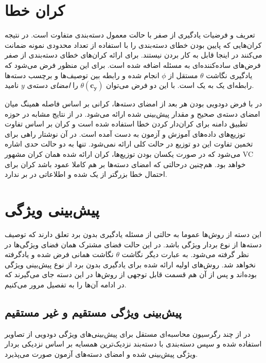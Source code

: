    


\section{کران خطا}\label{bound}
تعریف و فرضیات یادگیری از صفر با حالت معمول دسته‌بندی متفاوت است. در نتیجه کران‌هایی که پایین بودن خطای دسته‌بندی را با استفاده از تعداد محدودی نمونه ضمانت می‌کنند در اینجا قابل به کار بردن نیستند. برای ارائه کران‌های خطای دسته‌بندی از صفر فرض‌های ساده‌کننده‌ای به مسئله اضافه شده است. برای این منظور فرض می‌شود که یادگیری نگاشت 
$\theta$
 مستقل از $\phi$ انجام شده و رابطه بین توصیف‌ها و برچسب دسته‌ها رابطه‌ای یک به یک است. با این دو فرض می‌توان
  $\theta(\mathbf{c_y} ) $
   را \emph{ امضای}  دسته‌ی $y$ نامید. 

در \cite{hinton09} با فرض دودویی بودن هر بعد از امضای دسته‌ها، کرانی  بر اساس فاصله همینگ 
میان امضای دسته‌ی صحیح و مقدار پیش‌بینی شده ارائه می‌شود. در \cite{emb15} از نتایج مشابه در حوزه تطبیق دامنه برای کران‌دار کردن خطا استفاده شده است و کران بر اساس تفاوت توزیع‌های داده‌های آموزش و آزمون به دست آمده است. در آن نوشتار راهی برای تخمین تفاوت این دو توزیع در حالت کلی ارائه نمی‌شود. تنها به دو حالت حدی اشاره می‌شود که در صورت یکسان بودن توزیع‌ها، کران ارائه شده همان کران مشهور VC \cite{vapnik} خواهد بود. هم‌چنین درحالتی که امضای دسته‌ها بر هم کاملا عمود باشد کران برای احتمال خطا بزرگتر از یک شده و اطلاعاتی در بر ندارد. 
\section{پیش‌بینی ویژگی  }
این دسته از روش‌ها عموما به حالتی از مسئله یادگیری بدون برد تعلق دارند که توصیف دسته‌ها از نوع بردار ویژگی باشد. در این حالت فضای مشترک همان فضای ویژگی‌ها در نظر گرفته می‌شود. به عبارت دیگر نگاشت $\theta$ نگاشت همانی فرض شده و یادگرفته نخواهد شد. روش‌های اولیه ارائه شده برای یادگیری بدون برد از نوع پیش‌بینی ویژگی
بوده‌اند و پس از آن‌ هم قسمت قابل توجهی از روش‌ها در این دسته جای می‌گیرند که در ادامه آن‌ها را به تفصیل مرور می‌کنیم.

\subsection{پیش‌بینی ویژگی مستقیم و غیر مستقیم}

در \cite{hinton09} از چند رگرسیون محاسبه‌ای  مستقل برای پیش‌بینی‌های ویژگی دودویی از تصاویر  استفاده شده و سپس دسته‌بندی با دسته‌بند نزدیک‌ترین همسایه بر اساس نزدیکی بردار ویژگی پیش‌بینی شده و امضای دسته‌های آزمون صورت می‌پذیرد.


